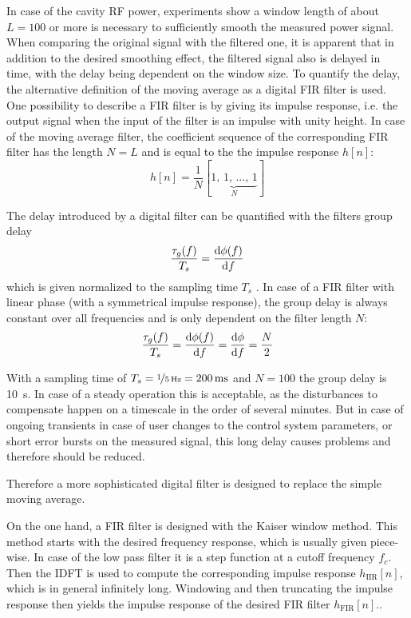 In case of the cavity RF power, experiments show a window length of about $L=100$ or more is necessary to sufficiently smooth the measured power signal.
When comparing the original signal with the filtered one, it is apparent that in addition to the desired smoothing effect, the filtered signal also is delayed in time, with the delay being dependent on the window size.
To quantify the delay, the alternative definition of the moving average as a digital FIR filter is used.
One possibility to describe a FIR filter is by giving its impulse response, i.e. the output signal when the input of the filter is an impulse with unity height. In case of the moving average filter, the coefficient sequence of the corresponding FIR filter has the length $N=L$ and is equal to the the impulse response $h[n]$:
\begin{equation}
h[n] = \frac{1}{N} [\underbrace{1,\,1,\,...,\,1}_N]
\end{equation}

The delay introduced by a digital filter can be quantified with the filters group delay
\begin{equation}
\frac{\tau_g(f)}{T_s} = \frac{\text{d}{\phi(f)}}{\text{d}{f}}
\end{equation}
which is given normalized to the sampling time $T_s$ \cite[p.~70]{Kammeyer2002}. In case of a FIR filter with linear phase (with a symmetrical impulse response), the group delay is always constant over all frequencies and is only dependent on the filter length $N$\cite[p.~165]{Kammeyer2002}:
\begin{equation}\label{eq:groupD}
\frac{\tau_g(f)}{T_s} = \frac{\text{d}{\phi(f)}}{\text{d}{f}} = \frac{\text{d}{\phi}}{\text{d}{f}} = \frac{N}{2}
\end{equation}

With a sampling time of $T_s=\nicefrac{1}{\SI{5}{\hertz}}=\SI{200}{\milli\second}$ and $N=100$ the group delay is \SI{10}{\second}. In case of a steady operation this is acceptable, as the disturbances to compensate happen on a timescale in the order of several minutes.
But in case of ongoing transients in case of user changes to the control system parameters, or short error bursts on the measured signal, this long delay causes problems and therefore should be reduced.

Therefore a more sophisticated digital filter is designed to replace the simple moving average.

On the one hand, a FIR filter is designed with the Kaiser window method.
This method starts with the desired frequency response, which is usually given piece-wise. 
In case of the low pass filter it is a step function at a cutoff frequency $f_c$.
Then the IDFT is used to compute the corresponding impulse response $h_\text{IIR}[n]$, which is in general infinitely long.
Windowing and then truncating the impulse response then yields the impulse response of the desired FIR filter $h_\text{FIR}[n]$.\cite[p.~533]{Oppenheim2010}.

